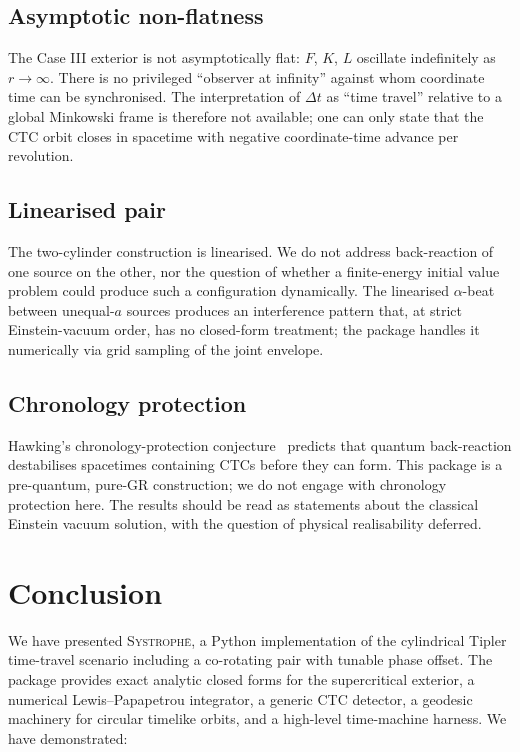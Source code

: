 \documentclass[11pt,a4paper]{article}
\begin{document}
\subsection{Asymptotic non-flatness}

The Case III exterior is not asymptotically flat: $F$, $K$, $L$
oscillate indefinitely as $r \to \infty$. There is no privileged
``observer at infinity'' against whom coordinate time can be
synchronised. The interpretation of $\Delta t$ as ``time travel''
relative to a global Minkowski frame is therefore not available; one
can only state that the CTC orbit closes in spacetime with negative
coordinate-time advance per revolution.

\subsection{Linearised pair}

The two-cylinder construction is linearised. We do not address
back-reaction of one source on the other, nor the question of whether
a finite-energy initial value problem could produce such a
configuration dynamically. The linearised $\alpha$-beat between
unequal-$a$ sources produces an interference pattern that, at strict
Einstein-vacuum order, has no closed-form treatment; the package
handles it numerically via grid sampling of the joint envelope.

\subsection{Chronology protection}

Hawking's chronology-protection conjecture~\cite{Hawking1992} predicts
that quantum back-reaction destabilises spacetimes containing CTCs
before they can form. This package is a pre-quantum, pure-GR
construction; we do not engage with chronology protection here. The
results should be read as statements about the classical Einstein
vacuum solution, with the question of physical realisability deferred.

\section{Conclusion}

We have presented \textsc{Systroph\=e}, a Python implementation of
the cylindrical Tipler time-travel scenario including a co-rotating
pair with tunable phase offset. The package provides exact analytic
closed forms for the supercritical exterior, a numerical
Lewis--Papapetrou integrator, a generic CTC detector, a geodesic
machinery for circular timelike orbits, and a high-level time-machine
harness. We have demonstrated:
\end{document}
